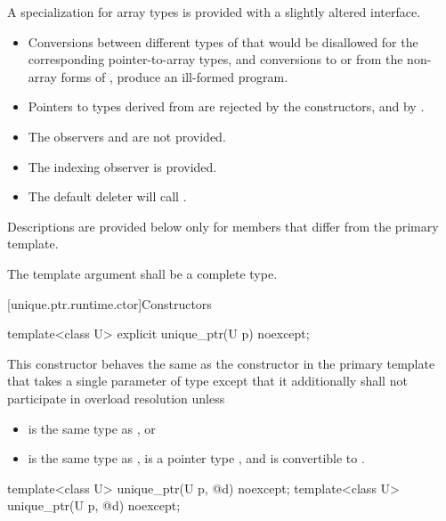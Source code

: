 \pnum
A specialization for array types is provided with a slightly altered
interface.

\begin{itemize}
\item Conversions between different types of
that would be disallowed for the corresponding pointer-to-array types,
and conversions to or from the non-array forms of
, produce an ill-formed program.

\item Pointers to types derived from  are
rejected by the constructors, and by .

\item The observers  and
 are not provided.

\item The indexing observer  is provided.

\item The default deleter will call .
\end{itemize}

\pnum
Descriptions are provided below only for members that
differ from the primary template.

\pnum
The template argument  shall be a complete type.

[unique.ptr.runtime.ctor]{Constructors}

%
\begin{itemdecl}
template<class U> explicit unique_ptr(U p) noexcept;
\end{itemdecl}

\begin{itemdescr}
\pnum
This constructor behaves the same as
the constructor in the primary template that
takes a single parameter of type 
except that it additionally
shall not participate in overload resolution unless

\begin{itemize}
\item {} is the same type as , or
\item {} is the same type as ,
 is a pointer type , and
 is convertible to .
\end{itemize}
\end{itemdescr}

%
\begin{itemdecl}
template<class U> unique_ptr(U p, @\seebelow@ d) noexcept;
template<class U> unique_ptr(U p, @\seebelow@ d) noexcept;
\end{itemdecl}

